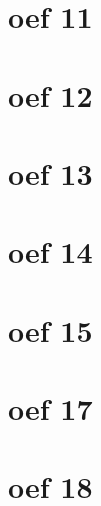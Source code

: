 \documentclass[lineaire_algebra_oplossingen.tex]{subfiles}
\begin{document}
\section{oef 11}

\section{oef 12}
\section{oef 13}
\section{oef 14}
\section{oef 15}
\section{oef 17}
\section{oef 18}
\end{document}
